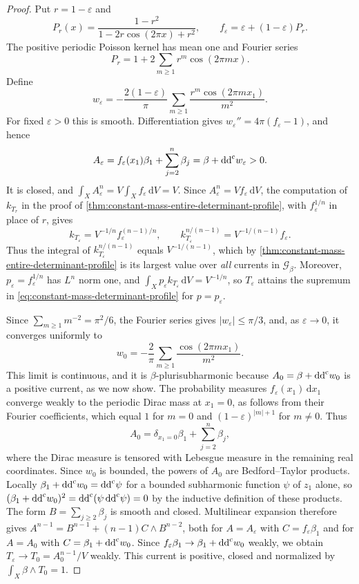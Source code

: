 \begin{proof}
Put $r=1-\varepsilon$ and
\[
 P_r(x)=\frac{1-r^2}{1-2r\cos(2\pi x)+r^2},\qquad
 f_\varepsilon=\varepsilon+(1-\varepsilon)P_r.
\]
The positive periodic Poisson kernel has mean one and Fourier series
\[
 P_r=1+2\sum_{m\geq1}r^m\cos(2\pi mx).
\]
Define
\[
 w_\varepsilon=-\frac{2(1-\varepsilon)}{\pi}
       \sum_{m\geq1}\frac{r^m\cos(2\pi mx_1)}{m^2}.
\]
For fixed $\varepsilon>0$ this is smooth. Differentiation gives
$w_\varepsilon''=4\pi(f_\varepsilon-1)$, and hence
\[
 A_\varepsilon=f_\varepsilon(x_1)\beta_1+
        \sum_{j=2}^n\beta_j=\beta+\mathrm{dd}^{\mathrm{c}} w_\varepsilon>0.
\]
It is closed, and $\int_X A_\varepsilon^n=V\int_Xf_\varepsilon\,\mathrm dV=V$.
Since $A_\varepsilon^n=Vf_\varepsilon\,\mathrm dV$, the computation of $k_{T_r}$ in the proof of \cref{thm:constant-mass-entire-determinant-profile}, with $f_\varepsilon^{1/n}$ in place of $r$, gives
\[
 k_{T_\varepsilon}=V^{-1/n}f_\varepsilon^{(n-1)/n},
 \qquad k_{T_\varepsilon}^{n/(n-1)}
       =V^{-1/(n-1)}f_\varepsilon.
\]
Thus the integral of $k_{T_\varepsilon}^{n/(n-1)}$ equals $V^{-1/(n-1)}$, which by \cref{thm:constant-mass-entire-determinant-profile} is its largest value over
\emph{all} currents in $\mathscr G_\beta$. Moreover, $p_\varepsilon=f_\varepsilon^{1/n}$ has $L^n$ norm one,
and $\int_X p_\varepsilon k_{T_\varepsilon}\,\mathrm dV=V^{-1/n}$, so
$T_\varepsilon$ attains the supremum in \eqref{eq:constant-mass-determinant-profile}
for $p=p_\varepsilon$.

Since $\sum_{m\geq1}m^{-2}=\pi^2/6$, the Fourier series gives $|w_\varepsilon|\leq\pi/3$, and, as $\varepsilon\to0$, it converges
uniformly to
\[
 w_0=-\frac2\pi\sum_{m\geq1}\frac{\cos(2\pi mx_1)}{m^2}.
\]
This limit is continuous, and it is $\beta$-plurisubharmonic because
$A_0=\beta+\mathrm{dd}^{\mathrm{c}} w_0$ is a positive current, as we now show.
The probability measures $f_\varepsilon(x_1)\,\mathrm dx_1$ converge weakly to the
periodic Dirac mass at $x_1=0$, as follows from their Fourier
coefficients, which equal $1$ for $m=0$ and $(1-\varepsilon)^{|m|+1}$ for $m\neq0$. Thus
\[
 A_0=\delta_{x_1=0}\beta_1+\sum_{j=2}^n\beta_j,
\]
where the Dirac measure is tensored with Lebesgue measure in the
remaining real coordinates. Since $w_0$ is bounded, the powers of $A_0$ are
Bedford--Taylor products. Locally
$\beta_1+\mathrm{dd}^{\mathrm{c}} w_0=\mathrm{dd}^{\mathrm{c}}\psi$ for a bounded subharmonic function $\psi$ of $z_1$ alone,
so $(\beta_1+\mathrm{dd}^{\mathrm{c}} w_0)^2=\mathrm{dd}^{\mathrm{c}}(\psi\,\mathrm{dd}^{\mathrm{c}}\psi)=0$ by the inductive definition of these products. The form $B=\sum_{j\geq2}\beta_j$ is smooth and closed.
Multilinear expansion therefore gives $A^{n-1}=B^{n-1}+(n-1)C\wedge B^{n-2}$, both for $A=A_\varepsilon$ with $C=f_\varepsilon\beta_1$ and for $A=A_0$ with $C=\beta_1+\mathrm{dd}^{\mathrm{c}} w_0$. Since $f_\varepsilon\beta_1\to\beta_1+\mathrm{dd}^{\mathrm{c}} w_0$ weakly, we obtain
$T_\varepsilon\to T_0=A_0^{n-1}/V$ weakly. This current is
positive, closed and normalized by $\int_X\beta\wedge T_0=1$.


\end{proof}
